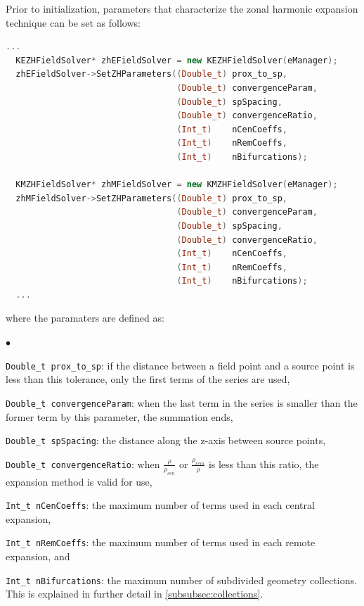 \documentclass[11pt,a4paper,oneside]{article}
\newcommand{\squishlist}{
   \begin{list}{$\bullet$}
    { \setlength{\itemsep}{0pt}      \setlength{\parsep}{3pt}
      \setlength{\topsep}{3pt}       \setlength{\partopsep}{0pt}
      \setlength{\leftmargin}{1.5em} \setlength{\labelwidth}{1em}
      \setlength{\labelsep}{0.5em} } }
\newcommand{\squishend}{
    \end{list}  }
\begin{document}
Prior to initialization, parameters that characterize the zonal harmonic expansion technique can be set as follows:

\begin{lstlisting}[language=C++]
  ...
  KEZHFieldSolver* zhEFieldSolver = new KEZHFieldSolver(eManager);
  zhEFieldSolver->SetZHParameters((Double_t) prox_to_sp,
                                  (Double_t) convergenceParam,
                                  (Double_t) spSpacing,
                                  (Double_t) convergenceRatio,
                                  (Int_t)    nCenCoeffs,
                                  (Int_t)    nRemCoeffs,
                                  (Int_t)    nBifurcations);

  KMZHFieldSolver* zhMFieldSolver = new KMZHFieldSolver(eManager);
  zhMFieldSolver->SetZHParameters((Double_t) prox_to_sp,
                                  (Double_t) convergenceParam,
                                  (Double_t) spSpacing,
                                  (Double_t) convergenceRatio,
                                  (Int_t)    nCenCoeffs,
                                  (Int_t)    nRemCoeffs,
                                  (Int_t)    nBifurcations);
  ...
\end{lstlisting}
%
where the paramaters are defined as:
%
\squishlist
\item \texttt{Double\_t prox\_to\_sp}: if the distance between a field point and a source point is less than this tolerance, only the first terms of the series are used,
\item \texttt{Double\_t convergenceParam}:  when the last term in the series is smaller than the former term by this parameter, the summation ends,
\item \texttt{Double\_t spSpacing}: the distance along the z-axis between source points,
\item \texttt{Double\_t convergenceRatio}: when $\frac{\rho}{\rho_{cen}}$ or $\frac{\rho_{rem}}{\rho}$ is less than this ratio, the expansion method is valid for use,
\item \texttt{Int\_t nCenCoeffs}: the maximum number of terms used in each central expansion,
\item \texttt{Int\_t nRemCoeffs}: the maximum number of terms used in each remote expansion, and
\item \texttt{Int\_t nBifurcations}: the maximum number of subdivided geometry collections.  This is explained in further detail in \ref{subsubsec:collections}.
\squishend
\end{document}
